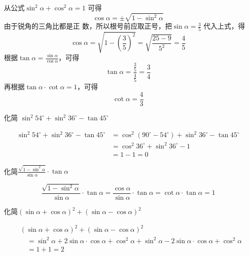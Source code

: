 \begin{solution}
 从公式$\sin^2\alpha +\cos^2\alpha =1$ 可得
   \[ \cos\alpha =\pm\sqrt{1-\sin^2\alpha}\] 
   由于锐角的三角比都是正
    数，所以根号前应取正号，把$\sin\alpha =\frac{3}{5}$
    代入上式，得
\[\cos\alpha=\sqrt{1-\left(\frac{3}{5}\right)^2}=\sqrt{\frac{25-9}{5^2}}=\frac{4}{5}\]
根据$\tan\alpha=\frac{\sin\alpha}{\cos\alpha}$，可得
\[\tan\alpha=\frac{\frac{3}{5}}{\frac{4}{5}}=\frac{3}{4}\]
再根据$\tan\alpha\cdot \cot\alpha=1$，可得
\[\cot\alpha=\frac{4}{3}\]
\end{solution}

\begin{example}
    化简
    $\sin^2 54^{\circ}+\sin^2 36^{\circ}-\tan 45^{\circ}$
\end{example}

\begin{solution}
\[\begin{split}
    \sin^2 54^{\circ}+\sin^2 36^{\circ}-\tan 45^{\circ}&=
    \cos^2(90^{\circ}-54^{\circ})+\sin^2 36^{\circ}-\tan 45^{\circ}\\
    &=\cos^2 36^{\circ}+\sin^2 36^{\circ}-1\\
    &=1-1=0
\end{split}\]
\end{solution}


\begin{example}
    化简$\frac{\sqrt{1-\sin^2\alpha}}{\sin\alpha}\cdot \tan\alpha$
\end{example}

\begin{solution}
    \[\frac{\sqrt{1-\sin^2\alpha}}{\sin\alpha}\cdot \tan\alpha=\frac{\cos\alpha}{\sin\alpha}\cdot \tan\alpha=\cot\alpha\cdot \tan\alpha=1\]
\end{solution}

\begin{example}
    化简$(\sin\alpha+\cos\alpha)^2+(\sin\alpha-\cos\alpha)^2$
\end{example}

\begin{solution}
\[\begin{split}
&    (\sin\alpha+\cos\alpha)^2+(\sin\alpha-\cos\alpha)^2\\  
&\quad =\sin^2\alpha+2\sin\alpha\cdot \cos\alpha+\cos^2\alpha
+\sin^2\alpha-2\sin\alpha\cdot\cos\alpha+\cos^2\alpha\\
&\quad =1+1=2
\end{split}\]    
\end{solution}

